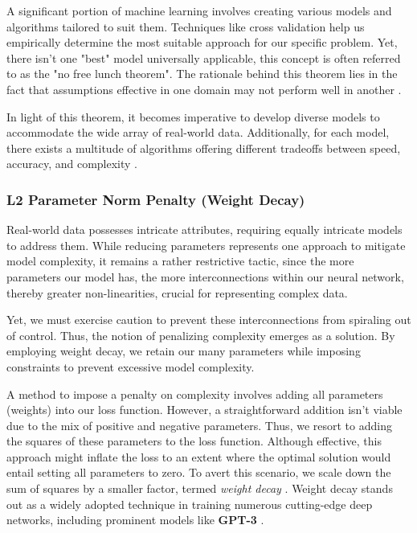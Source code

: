 \documentclass{article}
\begin{document}
A significant portion of machine learning involves creating various models and algorithms tailored to suit them. Techniques like cross validation help us empirically determine the most suitable approach for our specific problem. Yet, there isn't one "best" model universally applicable, this concept is often referred to as the "no free lunch theorem". The rationale behind this theorem lies in the fact that assumptions effective in one domain may not perform well in another \citep{MurphyML}.

In light of this theorem, it becomes imperative to develop diverse models to accommodate the wide array of real-world data. Additionally, for each model, there exists a multitude of algorithms offering different tradeoffs between speed, accuracy, and complexity \citep{MurphyML}.

\subsubsection{L2 Parameter Norm Penalty (Weight Decay)}    \label{sub:L1 and L2 Regularization}
Real-world data possesses intricate attributes, requiring equally intricate models to address them. While reducing parameters represents one approach to mitigate model complexity, it remains a rather restrictive tactic, since the more parameters our model has, the more interconnections within our neural network, thereby greater non-linearities, crucial for representing complex data.

Yet, we must exercise caution to prevent these interconnections from spiraling out of control. Thus, the notion of penalizing complexity emerges as a solution. By employing weight decay, we retain our many parameters while imposing constraints to prevent excessive model complexity.

A method to impose a penalty on complexity involves adding all parameters (weights) into our loss function. However, a straightforward addition isn't viable due to the mix of positive and negative parameters. Thus, we resort to adding the squares of these parameters to the loss function. Although effective, this approach might inflate the loss to an extent where the optimal solution would entail setting all parameters to zero. To avert this scenario, we scale down the sum of squares by a smaller factor, termed \textit{weight decay} \citep{Vasani_2019}. Weight decay stands out as a widely adopted technique in training numerous cutting-edge deep networks, including prominent models like \textbf{GPT-3} \citep{andriushchenko2023need}.
\end{document}
